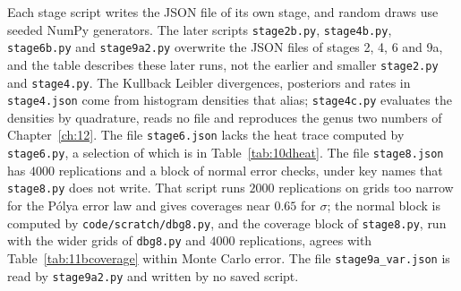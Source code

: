 Each stage script writes the JSON file of its own stage, and random draws use seeded NumPy generators. The later scripts \texttt{stage2b.py}, \texttt{stage4b.py}, \texttt{stage6b.py} and \texttt{stage9a2.py} overwrite the JSON files of stages 2, 4, 6 and 9a, and the table describes these later runs, not the earlier and smaller \texttt{stage2.py} and \texttt{stage4.py}. The Kullback Leibler divergences, posteriors and rates in \texttt{stage4.json} come from histogram densities that alias; \texttt{stage4c.py} evaluates the densities by quadrature, reads no file and reproduces the genus two numbers of Chapter~\ref{ch:12}. The file \texttt{stage6.json} lacks the heat trace computed by \texttt{stage6.py}, a selection of which is in Table~\ref{tab:10dheat}. The file \texttt{stage8.json} has $4000$ replications and a block of normal error checks, under key names that \texttt{stage8.py} does not write. That script runs $2000$ replications on grids too narrow for the P\'olya error law and gives coverages near $0.65$ for $\sigma$; the normal block is computed by \texttt{code/scratch/dbg8.py}, and the coverage block of \texttt{stage8.py}, run with the wider grids of \texttt{dbg8.py} and $4000$ replications, agrees with Table~\ref{tab:11bcoverage} within Monte Carlo error. The file \texttt{stage9a\_var.json} is read by \texttt{stage9a2.py} and written by no saved script.

